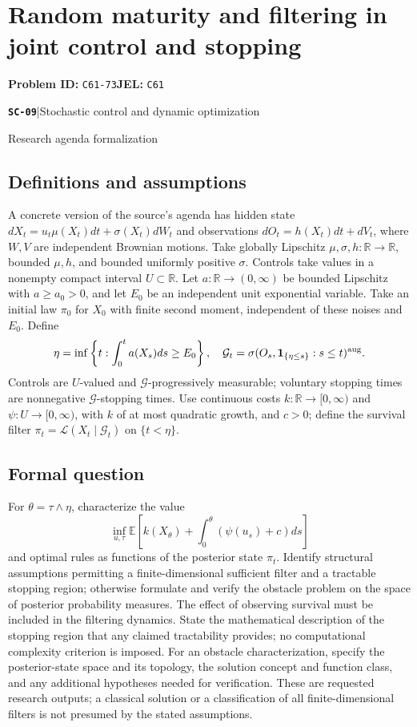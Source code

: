 \documentclass[11pt,a4paper]{article}
\newcommand{\R}{\mathbb R}
\newcommand{\E}{\mathbb E}
\newcommand{\ind}{\mathbf 1}
\newcommand{\entrymeta}[3]{{\sffamily\small\color{muted}\textbf{\texttt{#1}}\quad|\quad #2\par #3\par}}
\begin{document}
\section*{Random maturity and filtering in joint control and stopping}
\textbf{Problem ID:} \texttt{C61-73}\quad \textbf{JEL:} \texttt{C61}\par
\label{problem:OP-0570}
\label{beyond:SC-09}
\entrymeta{SC-09}{Stochastic control and dynamic optimization}{Research agenda formalization}
\subsection*{Definitions and assumptions}
A concrete version of the source's agenda has hidden state
$dX_t=u_t\mu(X_t)dt+\sigma(X_t)dW_t$ and observations
$dO_t=h(X_t)dt+dV_t$, where $W,V$ are independent Brownian motions.
Take globally Lipschitz $\mu,\sigma,h:\R\to\R$, bounded $\mu,h$, and bounded
uniformly positive $\sigma$. Controls take values in a nonempty compact interval
$U\subset\R$. Let $a:\R\to(0,\infty)$ be bounded Lipschitz with $a\geq a_0>0$, and
let $E_0$ be an independent unit exponential variable. Take an initial
law $\pi_0$ for $X_0$ with finite second moment, independent of these
noises and $E_0$. Define
\[
 \eta=\inf\left\{t:\int_0^t a(X_s)ds\geq E_0\right\},\quad
 \mathcal G_t=\sigma(O_s,\ind_{\{\eta\leq s\}}:s\leq t)^{\rm aug}.
\]
Controls are $U$-valued and $\mathcal G$-progressively measurable;
voluntary stopping times are nonnegative $\mathcal G$-stopping times.
Use continuous costs $k:\R\to[0,\infty)$ and $\psi:U\to[0,\infty)$, with $k$ of at most quadratic
growth, and $c>0$; define the survival filter
$\pi_t=\mathcal L(X_t\mid\mathcal G_t)$ on $\{t<\eta\}$.
\subsection*{Formal question}
For $\theta=\tau\wedge\eta$, characterize the value
\[
 \inf_{u,\tau}\E\left[k(X_\theta)
                 +\int_0^\theta(\psi(u_s)+c)ds\right]
\]
and optimal rules as functions of the posterior state $\pi_t$.
Identify structural assumptions permitting a finite-dimensional sufficient
filter and a tractable stopping region; otherwise formulate and verify
the obstacle problem on the space of posterior probability measures.
The effect of observing survival must be included in the filtering dynamics.
State the mathematical description of the stopping region that any claimed
tractability provides; no computational complexity criterion is imposed.
For an obstacle characterization, specify the posterior-state space and its
topology, the solution concept and function class, and any additional
hypotheses needed for verification. These are requested research outputs;
a classical solution or a classification of all finite-dimensional filters
is not presumed by the stated assumptions.
\end{document}
